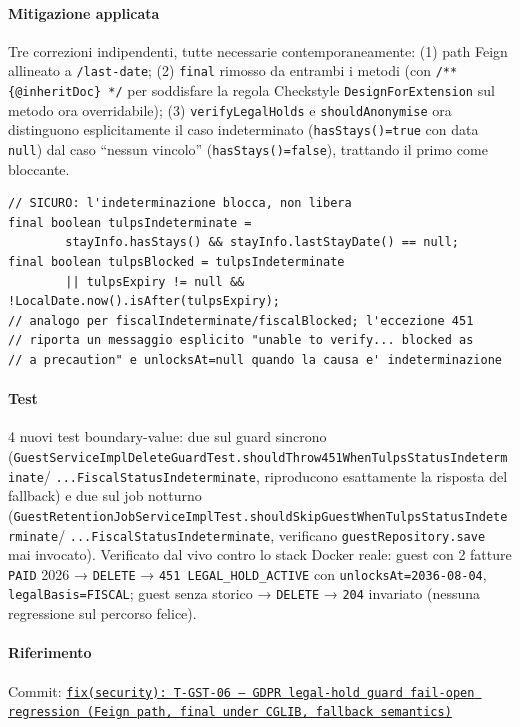 ﻿\documentclass[a4paper,12pt]{report}
\newcommand{\commitref}[2]{\texttt{\small \href{https://github.com/diegoandruccioli/hotel-pms/commit/#1}{#2}}}
\begin{document}
\paragraph{Mitigazione applicata}
Tre correzioni indipendenti, tutte necessarie contemporaneamente: (1)
path Feign allineato a \texttt{/last-date}; (2) \texttt{final} rimosso
da entrambi i metodi (con \texttt{/** \{@inheritDoc\} */} per soddisfare
la regola Checkstyle \texttt{DesignForExtension} sul metodo ora
overridabile); (3) \texttt{verifyLegalHolds} e \texttt{shouldAnonymise}
ora distinguono esplicitamente il caso indeterminato (\texttt{hasStays()=true}
con data \texttt{null}) dal caso ``nessun vincolo'' (\texttt{hasStays()=false}),
trattando il primo come bloccante.

\begin{securebox}[title={Codice Sicuro --- GuestServiceImpl.java (fix)}]
\begin{lstlisting}[style=java]
// SICURO: l'indeterminazione blocca, non libera
final boolean tulpsIndeterminate =
        stayInfo.hasStays() && stayInfo.lastStayDate() == null;
final boolean tulpsBlocked = tulpsIndeterminate
        || tulpsExpiry != null && !LocalDate.now().isAfter(tulpsExpiry);
// analogo per fiscalIndeterminate/fiscalBlocked; l'eccezione 451
// riporta un messaggio esplicito "unable to verify... blocked as
// a precaution" e unlocksAt=null quando la causa e' indeterminazione
\end{lstlisting}
\end{securebox}

\paragraph{Test}
4 nuovi test boundary-value: due sul guard sincrono
(\texttt{GuestServiceImplDeleteGuardTest.shouldThrow451WhenTulpsStatusIndeterminate}/
\texttt{...FiscalStatusIndeterminate}, riproducono esattamente la risposta
del fallback) e due sul job notturno
(\texttt{GuestRetentionJobServiceImplTest.shouldSkipGuestWhenTulpsStatusIndeterminate}/
\texttt{...FiscalStatusIndeterminate}, verificano \texttt{guestRepository.save}
mai invocato). Verificato dal vivo contro lo stack Docker reale: guest con
2 fatture \texttt{PAID} 2026 → \texttt{DELETE} → \texttt{451 LEGAL\_HOLD\_ACTIVE}
con \texttt{unlocksAt=2036-08-04}, \texttt{legalBasis=FISCAL}; guest senza
storico → \texttt{DELETE} → \texttt{204} invariato (nessuna regressione sul
percorso felice).

\paragraph{Riferimento} Commit: \commitref{4db09fc}{fix(security): T-GST-06 --- GDPR legal-hold guard fail-open regression (Feign path, final under CGLIB, fallback semantics)}
\end{document}
